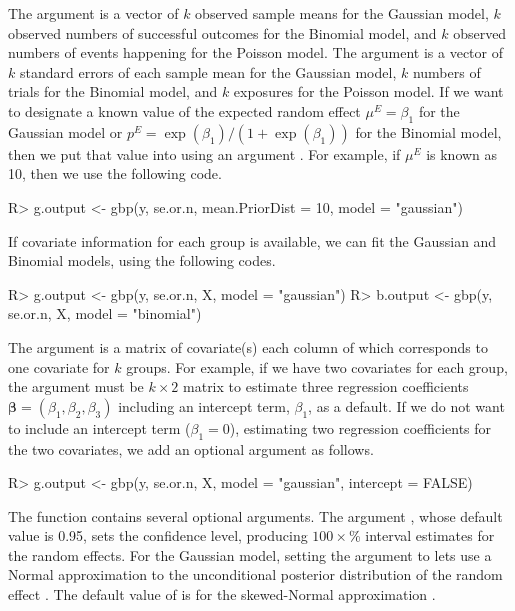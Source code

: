 \documentclass[article]{jss}
\begin{document}
The argument  is a vector of $k$ observed sample means  for the Gaussian model, $k$ observed numbers of successful outcomes for the Binomial model, and $k$ observed numbers of events happening for the Poisson model. The argument   is a vector of $k$ standard errors of each sample mean for the Gaussian model, $k$ numbers of trials for the Binomial model, and $k$ exposures for the Poisson model. If we want to designate a known value of the expected random effect $\mu^E=\beta_1$ for the Gaussian model or $p^E=\exp(\beta_1)/(1+\exp(\beta_1))$ for the Binomial model, then we put that value into  using an argument . For example, if  $\mu^E$ is known as 10, then we use the following code. %
\begin{CodeChunk}
\begin{CodeInput}
R> g.output <- gbp(y, se.or.n, mean.PriorDist = 10, model = "gaussian")
\end{CodeInput}
\end{CodeChunk}

If covariate information for each group is available, we can fit the Gaussian and Binomial models, using the following codes.
\begin{CodeChunk}
\begin{CodeInput}
R> g.output <- gbp(y, se.or.n, X, model = "gaussian")
R> b.output <- gbp(y, se.or.n, X, model = "binomial")
\end{CodeInput}
\end{CodeChunk}

The argument  is a matrix of covariate(s) each column of which corresponds to one covariate for $k$ groups. For example, if we have two covariates for each group, the argument  must be $k\times2$ matrix to estimate three regression coefficients $\boldsymbol{\beta}=(\beta_1, \beta_2, \beta_3)$ including an intercept term, $\beta_1$, as a default. If we do not want to include an intercept term ($\beta_1=0$), estimating two regression coefficients for the two covariates, we add an optional argument  as follows.
\begin{CodeChunk}
\begin{CodeInput}
R> g.output <- gbp(y, se.or.n, X, model = "gaussian", intercept = FALSE)
\end{CodeInput}
\end{CodeChunk}

The function  contains several optional arguments. The argument , whose default value is 0.95, sets the confidence level, producing $100\times$\% interval estimates for the random effects. For the Gaussian model, setting the argument  to  lets   use a Normal approximation to the unconditional posterior distribution of the random effect \citep{tang2011}. The default value of  is  for the skewed-Normal approximation \citep{kelly2014advances}. 
\end{document}
